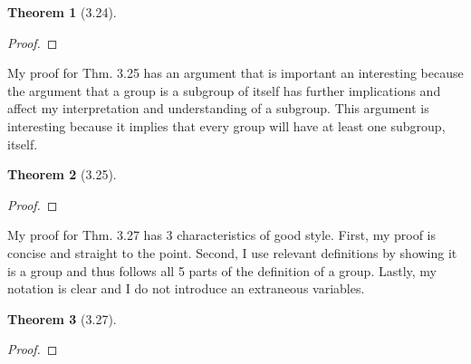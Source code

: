\documentclass{article}
\newtheorem*{thm}{Theorem}
\begin{document}
\begin{description}
\begin{thm}[3.24]
		\end{thm}
	      \begin{proof}
	      
	      \end{proof}

	      My proof for Thm. 3.25 has an argument that is important an interesting because the argument that a group is a subgroup of itself 
	      has further implications and affect my interpretation and understanding of a subgroup. 
	      This argument is interesting because it implies that every group will have at least one subgroup, itself. 
		\begin{thm}[3.25]
		
		\end{thm}
		\begin{proof}
		 
		\end{proof}


		My proof for Thm. 3.27 has 3 characteristics of good style. First, my proof is concise and straight to the point.
		Second, I use relevant definitions by showing it is a group and thus follows all 5 parts of the definition of a group.
		Lastly, my notation is clear and I do not introduce an extraneous variables. 
		\begin{thm}[3.27]
		  
	      
		\end{thm}
	      \begin{proof}
	      
	      \end{proof}

\end{description}
\end{document}
